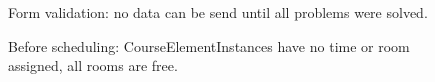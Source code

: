\begin{multicols}{2}

\begin{figure}[H]
%
\caption{Form validation: no data can be send until all problems were solved.}%
\end{figure}

\begin{figure}[H]
%
\caption{Before scheduling: CourseElementInstances have no time or room assigned, all rooms are free.}%
\end{figure}

\end{multicols}
